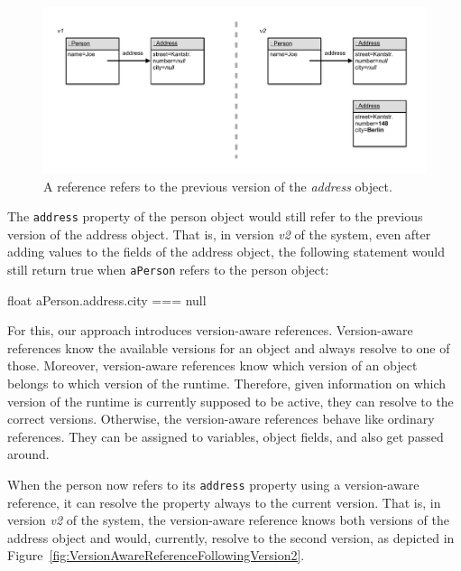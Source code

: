 \begin{figure}[h]
    \centering
    \includegraphics[width=\textwidth]{figures/4_approach/4_referenceToPreviousVersion.pdf}
    \caption{A reference refers to the previous version of the \emph{address} object.}
    \label{fig:ReferenceFixedToPreviousVersion}
\end{figure}

The \lstinline{address} property of the person object would still refer to the previous version of the address object.
That is, in version \emph{v2} of the system, even after adding values to the fields of the address object, the following statement would still return true when \lstinline{aPerson} refers to the person object:

\begin{code}{}{float}
aPerson.address.city === null
\end{code}
\iffalse
\end{verbatim}\fi

For this, our approach introduces version-aware references.
Version-aware references know the available versions for an object and always resolve to one of those.
Moreover, version-aware references know which version of an object belongs to which version of the runtime.
Therefore, given information on which version of the runtime is currently supposed to be active, they can resolve to the correct versions.
Otherwise, the version-aware references behave like ordinary references.
They can be assigned to variables, object fields, and also get passed around.

When the person now refers to its \lstinline{address} property using a version-aware reference, it can resolve the property always to the current version.
That is, in version \emph{v2} of the system, the version-aware reference knows both versions of the address object and would, currently, resolve to the second version, as depicted in Figure~\ref{fig:VersionAwareReferenceFollowingVersion2}.

